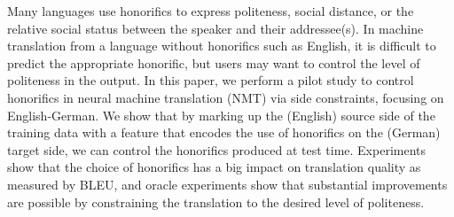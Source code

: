 Many languages use honorifics to express politeness, social distance, or the relative social status between the speaker and their addressee(s). In machine translation from a language without honorifics such as English, it is difficult to predict the appropriate honorific, but users may want to control the level of politeness in the output. In this paper, we perform a pilot study to control honorifics in neural machine translation (NMT) via side constraints, focusing on English-German. We show that by marking up the (English) source side of the training data with a feature that encodes the use of honorifics on the (German) target side, we can control the honorifics produced at test time. Experiments show that the choice of honorifics has a big impact on translation quality as measured by BLEU, and oracle experiments show that substantial improvements are possible by constraining the translation to the desired level of politeness.
